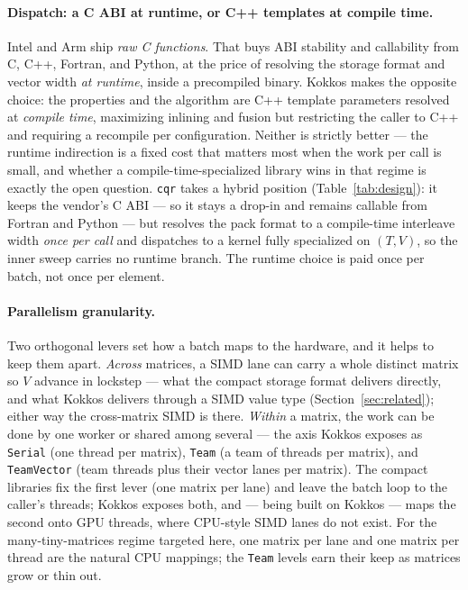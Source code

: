 \documentclass[11pt]{article}
\newcommand{\code}[1]{\texttt{#1}}
\newcommand{\cqr}{\mbox{\texttt{cqr}}}
\begin{document}
\paragraph{Dispatch: a C ABI at runtime, or C++ templates at compile time.}
Intel and Arm ship \emph{raw C functions}. That buys ABI stability and
callability from C, C++, Fortran, and Python, at the price of resolving the
storage format and vector width \emph{at runtime}, inside a precompiled binary.
Kokkos makes the opposite choice: the properties and the algorithm are C++
template parameters resolved at \emph{compile time}, maximizing inlining and
fusion but restricting the caller to C++ and requiring a recompile per
configuration. Neither is strictly better --- the runtime indirection is a fixed
cost that matters most when the work per call is small, and whether a
compile-time-specialized library wins in that regime is exactly the open question.
\cqr{} takes a hybrid position (Table~\ref{tab:design}): it keeps the vendor's C
ABI --- so it stays a drop-in and remains callable from Fortran and Python --- but
resolves the pack format to a compile-time interleave width \emph{once per call}
and dispatches to a kernel fully specialized on $(T,V)$, so the inner sweep
carries no runtime branch. The runtime choice is paid once per batch, not once per
element.

\paragraph{Parallelism granularity.}
Two orthogonal levers set how a batch maps to the hardware, and it helps to keep
them apart. \emph{Across} matrices, a SIMD lane can carry a whole distinct matrix
so $V$ advance in lockstep --- what the compact storage format delivers directly,
and what Kokkos delivers through a SIMD value type
(Section~\ref{sec:related}); either way the cross-matrix SIMD is there. \emph{Within}
a matrix, the work can be done by one worker or shared among several --- the axis
Kokkos exposes as \code{Serial} (one thread per matrix), \code{Team} (a team of
threads per matrix), and \code{TeamVector} (team threads plus their vector lanes
per matrix). The compact libraries fix the first lever (one matrix per lane) and
leave the batch loop to the caller's threads; Kokkos exposes both, and --- being
built on Kokkos --- maps the second onto GPU threads, where CPU-style SIMD lanes
do not exist. For the many-tiny-matrices regime targeted here, one matrix per lane
and one matrix per thread are the natural CPU mappings; the \code{Team} levels
earn their keep as matrices grow or thin out.
\end{document}

